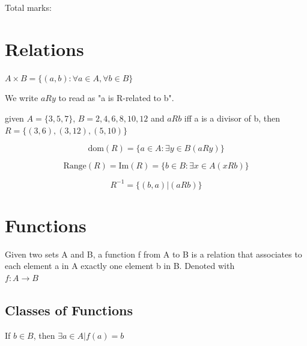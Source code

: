 


Total marks: 
\newpage



\section{Relations}

\begin{definition}
  $A \times B =  \{(a, b):  \forall a  \in  A, \forall b \in B\}$
\end{definition}

\begin{definition}
We write $a R y$ to read as "a  is R-related to b".
\end{definition}
\begin{example}
given $A = \{3, 5, 7\}$, $B = {2, 4, 6, 8, 10, 12}$ and $aRb$ iff a is a
divisor of b, then $R = \{(3, 6), (3, 12), (5, 10)\}$
\end{example}


\begin{definition}[Domain of $R$]
$$\text{dom}(R) = \{ a \in A : \exists y \in B (a R y) \}$$
\end{definition}

\begin{definition}
$$\text{Range}(R) = \text{Im}(R) = \{ b \in B : \exists x \in A (x R b) \}$$
\end{definition}

\begin{definition}[Inverse of $R$]
  $$R^{-1} = \{(b, a) | (a R b)\}$$
\end{definition}

\section{Functions}

\begin{definition}[Function $f: A \to B$]
Given two sets A and B, a function f from A to B is a relation
that associates to each element a in A exactly one element b in B.
Denoted with\\
$f : A \to B$

\end{definition}

\subsection{Classes of Functions}
\begin{definition}[Surjective]
  {\color{sol} If $b \in B$, then $\exists a \in A|f(a) = b$}
\end{definition}

